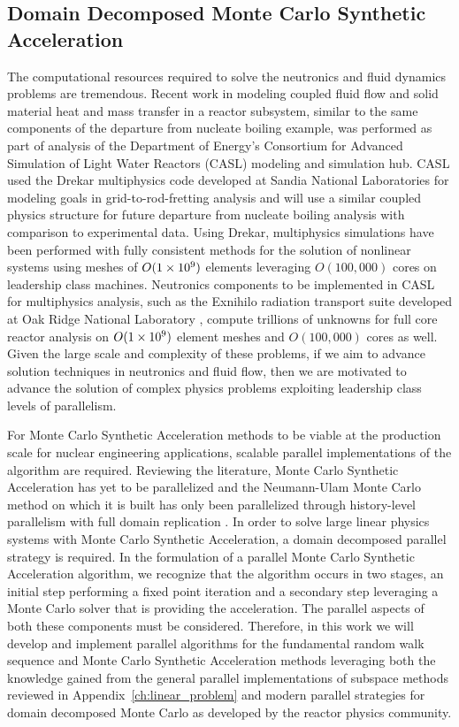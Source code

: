 \subsection{Domain Decomposed Monte Carlo Synthetic Acceleration}
\label{subsec:parallel_motivation}

The computational resources required to solve the neutronics and fluid
dynamics problems are tremendous. Recent work in modeling coupled
fluid flow and solid material heat and mass transfer in a reactor
subsystem, similar to the same components of the departure from
nucleate boiling example, was performed as part of analysis of the
Department of Energy's Consortium for Advanced Simulation of Light
Water Reactors (CASL) modeling and simulation hub. CASL used the
Drekar multiphysics code developed at Sandia National Laboratories
\cite{pawlowski_drekar_2012} for modeling goals in
grid-to-rod-fretting analysis and will use a similar coupled physics
structure for future departure from nucleate boiling analysis with
comparison to experimental data. Using Drekar, multiphysics
simulations have been performed with fully consistent methods for the
solution of nonlinear systems using meshes of $O(1\times 10^{9})$ elements
leveraging $O(100,000)$ cores on leadership class machines. Neutronics
components to be implemented in CASL for multiphysics analysis, such
as the Exnihilo radiation transport suite developed at Oak Ridge
National Laboratory \cite{evans_denovo:_2010}, compute trillions of
unknowns for full core reactor analysis on $O(1\times 10^{9})$ element
meshes and $O(100,000)$ cores as well. Given the large scale and
complexity of these problems, if we aim to advance solution techniques
in neutronics and fluid flow, then we are motivated to advance the
solution of complex physics problems exploiting leadership class
levels of parallelism.

For Monte Carlo Synthetic Acceleration methods to be viable at the
production scale for nuclear engineering applications, scalable
parallel implementations of the algorithm are required. Reviewing the
literature, Monte Carlo Synthetic Acceleration has yet to be
parallelized and the Neumann-Ulam Monte Carlo method on which it is
built has only been parallelized through history-level parallelism
with full domain replication \cite{alexandrov_efficient_1998}. In
order to solve large linear physics systems with Monte Carlo Synthetic
Acceleration, a domain decomposed parallel strategy is required. In
the formulation of a parallel Monte Carlo Synthetic Acceleration
algorithm, we recognize that the algorithm occurs in two stages, an
initial step performing a fixed point iteration and a secondary step
leveraging a Monte Carlo solver that is providing the
acceleration. The parallel aspects of both these components must be
considered. Therefore, in this work we will develop and implement
parallel algorithms for the fundamental random walk sequence and Monte
Carlo Synthetic Acceleration methods leveraging both the knowledge
gained from the general parallel implementations of subspace methods
reviewed in Appendix~\ref{ch:linear_problem} and modern parallel
strategies for domain decomposed Monte Carlo as developed by the
reactor physics community.

